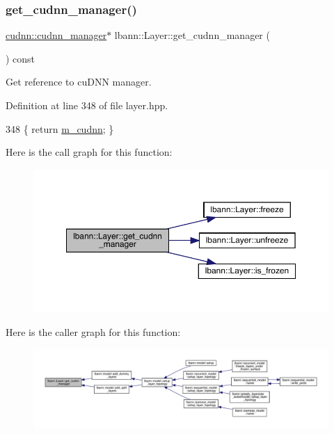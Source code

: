 \subsubsection{\texorpdfstring{get\+\_\+cudnn\+\_\+manager()}{get\_cudnn\_manager()}}
{\footnotesize\ttfamily \hyperlink{classlbann_1_1cudnn_1_1cudnn__manager}{cudnn\+::cudnn\+\_\+manager}$\ast$ lbann\+::\+Layer\+::get\+\_\+cudnn\+\_\+manager (\begin{DoxyParamCaption}{ }\end{DoxyParamCaption}) const\hspace{0.3cm}{\ttfamily [inline]}}

Get reference to cu\+D\+NN manager. 

Definition at line 348 of file layer.\+hpp.


\begin{DoxyCode}
348 \{ \textcolor{keywordflow}{return} \hyperlink{classlbann_1_1Layer_a08dbb94239e3b8c96329786c57c72e21}{m\_cudnn}; \}
\end{DoxyCode}
Here is the call graph for this function\+:\nopagebreak
\begin{figure}[H]
\begin{center}
\leavevmode
\includegraphics[width=350pt]{classlbann_1_1Layer_a63c694744d9360208642a35412a4e8ee_cgraph}
\end{center}
\end{figure}
Here is the caller graph for this function\+:\nopagebreak
\begin{figure}[H]
\begin{center}
\leavevmode
\includegraphics[width=350pt]{classlbann_1_1Layer_a63c694744d9360208642a35412a4e8ee_icgraph}
\end{center}
\end{figure}
\mbox{\label{classlbann_1_1Layer_a5dfb66e81fc085997402a5e2241316bd}} 
